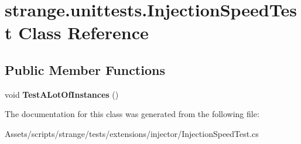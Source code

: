 \hypertarget{classstrange_1_1unittests_1_1_injection_speed_test}{\section{strange.\-unittests.\-Injection\-Speed\-Test Class Reference}
\label{classstrange_1_1unittests_1_1_injection_speed_test}
}
\subsection*{Public Member Functions}
\begin{DoxyCompactItemize}
\item 
\hypertarget{classstrange_1_1unittests_1_1_injection_speed_test_af3c60f7b3ab57cfe78fa0abdcfa01902}{void {\bfseries Test\-A\-Lot\-Of\-Instances} ()}\label{classstrange_1_1unittests_1_1_injection_speed_test_af3c60f7b3ab57cfe78fa0abdcfa01902}

\end{DoxyCompactItemize}


The documentation for this class was generated from the following file\-:\begin{DoxyCompactItemize}
\item 
Assets/scripts/strange/tests/extensions/injector/Injection\-Speed\-Test.\-cs\end{DoxyCompactItemize}
